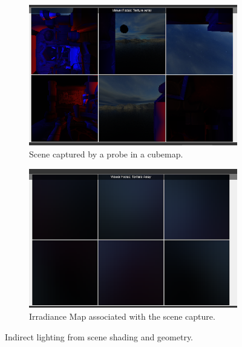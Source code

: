 \documentclass{rapportCS}
\begin{document}
\begin{figure}
    \begin{subfigure}{0.5\textwidth}
        \includegraphics[width=1\linewidth]{figures/scene-capture.png}
        \caption{Scene captured by a probe in a cubemap.}
        \label{fig:subim4}
    \end{subfigure}\hfill
    \begin{subfigure}{0.5\textwidth}
        \includegraphics[width=1\linewidth]{figures/irradiance-map-2.png} 
        \caption{Irradiance Map associated with the scene capture.}
        \label{fig:subim5}
    \end{subfigure}
    \caption{Indirect lighting from scene shading and geometry.}
\end{figure}
\end{document}
